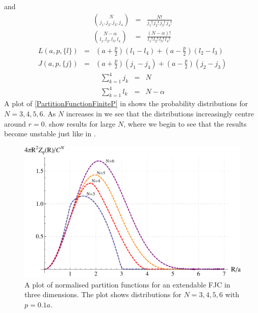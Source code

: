 %
and
%
\begin{eqnarray*}
\binom{N}{j_{1},j_{2},j_{3},j_{4}}&=&\frac{N!}{j_{1}!\,j_{2}!\,j_{3}!\,j_{4}!} \\
\binom{N-\alpha}{l_{1},l_{2},l_{3},l_{4}}&=&\frac{\left(N-\alpha\right)!}{l_{1}!\,l_{2}!\,l_{3}!\,l_{4}!}
\end{eqnarray*}
%
\begin{eqnarray*}
L\left(a,p,\{l\}\right)&=&\left(a+\frac{p}{2}\right)\left(l_{1}-l_{4}\right)+\left(a-\frac{p}{2}\right)\left(l_{2}-l_{3}\right) \\
J\left(a,p,\{j\}\right)&=&\left(a+\frac{p}{2}\right)\left(j_{1}-j_{4}\right)+\left(a-\frac{p}{2}\right)\left(j_{2}-j_{3}\right)
\end{eqnarray*}
%
\begin{eqnarray*}
\sum^{4}_{k=1}j_{k}&=&N \\
\sum_{k=1}^{4}l_{k}&=&N-\alpha
\end{eqnarray*}
%
A plot of \eqref{PartitionFunctionFiniteP} in  shows
the probability distributions for $N=3,4,5,6$. As $N$ increases in  we see that the distributions increasingly centre around $r=0$.  show results for large $N$, where we begin to see that the results become unstable just like in .

\begin{figure}[H]
\includegraphics[scale=0.8]{Graphics/3D/MultigraphFinitePSmall.pdf}
\caption{A plot of normalised partition functions for an extendable FJC in three dimensions. The plot shows distributions for $N=3,4,5,6$ with $p=0.1a$.}
\label{fig:Z3DMultigraphNormailsed}
\end{figure}


